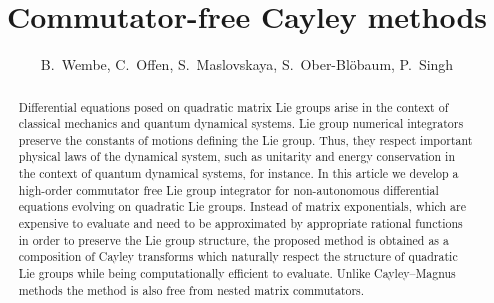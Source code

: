 \documentclass{article}
\title{Commutator-free Cayley methods}
\author{B.~Wembe,  C.~Offen, S.~Maslovskaya, S.~Ober-Blöbaum, P.~Singh}
\date{}
\begin{document}
\maketitle











\begin{abstract}
Differential equations posed on quadratic matrix Lie groups arise in the context of classical mechanics and quantum dynamical systems. Lie group numerical integrators preserve the constants of motions defining the Lie group. Thus, they respect important physical laws of the dynamical system, such as unitarity and energy conservation in the context of quantum dynamical systems, for instance.
In this article we develop a high-order commutator free Lie group integrator for non-autonomous differential equations evolving on quadratic Lie groups. Instead of matrix exponentials, which are expensive to evaluate and need to be approximated by appropriate rational functions in order to preserve the Lie group structure, the proposed method is obtained as a composition of Cayley transforms which naturally respect the structure of quadratic Lie groups while being computationally efficient to evaluate. Unlike Cayley--Magnus methods the method is also free from nested matrix commutators.
\end{abstract}
\end{document}

